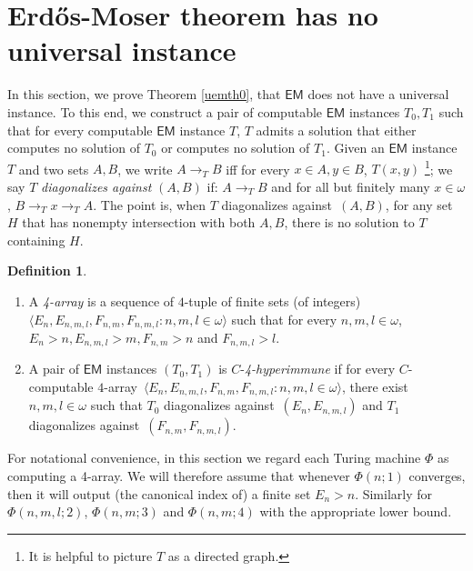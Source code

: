 \documentclass{amsart}
\theoremstyle{definition}
\newtheorem{definition}[theorem]{Definition}
\theoremstyle{remark}
\numberwithin{equation}{section}
\theoremstyle{noparens}
\def\msf{\mathsf}
\def\iatfs{array}
\def\r{\rightarrow}
\def\iatfshyp{4-hyperimmune}
\def\diagonalagainst{diagonalizes against}
\begin{document}
\section{Erd\H{o}s-Moser theorem has no universal instance}
\label{uemsec1}




In this section,
we prove Theorem \ref{uemth0},
that $\msf{EM}$ does not have a universal instance.
To this end, we construct a pair of computable $\msf{EM}$ instances
$T_0,T_1$ such that for every computable $\msf{EM}$ instance $T$,
$T$ admits a solution that either computes no
solution of $T_0$ or computes no  solution of $T_1$.
Given an   $\msf{EM}$ instance
$T$ and two sets $A,B$,
we write $A\r_T B$ iff
for every $x\in A, y\in B$, $T(x,y)$
\footnote{It is helpful to picture $T$ as a directed graph.};
we say $T$ \emph{\diagonalagainst}
$(A,B)$
if: $A\r_{T} B$ and for all but finitely many
$x\in\omega$, $B\r_{T} x\r_{T} A$.
The point is, when $T$  \diagonalagainst\ $(A,B)$,
for any set $H$ that has nonempty intersection with
both $A,B$,  there is no solution to $T$ containing
$H$.

\begin{definition}
\
\begin{enumerate}
\item A \emph{4-\iatfs}
is a sequence of $4$-tuple
 of finite sets (of integers) $\langle E_n,E_{n,m,l}, F_{n,m},
 F_{n,m,l}: n,m,l\in\omega\rangle$
such that for every $n,m,l\in \omega$, $E_n>n,
E_{n,m,l}>  m, F_{n,m}>n$
and $F_{n,m,l}> l$.

\item A pair of $\msf{EM}$ instances
$(T_0,T_1) $ is $C$-\emph{\iatfshyp}
if for every $C$-computable
$4$-\iatfs\  $\langle E_n,E_{n,m,l}, F_{n,m},
 F_{n,m,l}: n,m,l\in\omega\rangle$,
there exist $n,m,l\in\omega$  such that
$T_0$ \diagonalagainst\ $(E_{n},E_{n,m,l} )$
and $T_1$ \diagonalagainst\ $(F_{n,m},F_{n,m,l})$.

\end{enumerate}
\end{definition}

For notational convenience,
in this section we regard each Turing machine $\Phi$ as computing a 4-\iatfs. We will therefore assume that whenever $\Phi(n;1)$ converges,
then it will output (the canonical index of) a finite  set $E_n > n$. Similarly for $\Phi(n,m, l;2)$, $\Phi(n,m;3)$ and $\Phi(n,m;4)$ with the appropriate lower bound.
\end{document}
